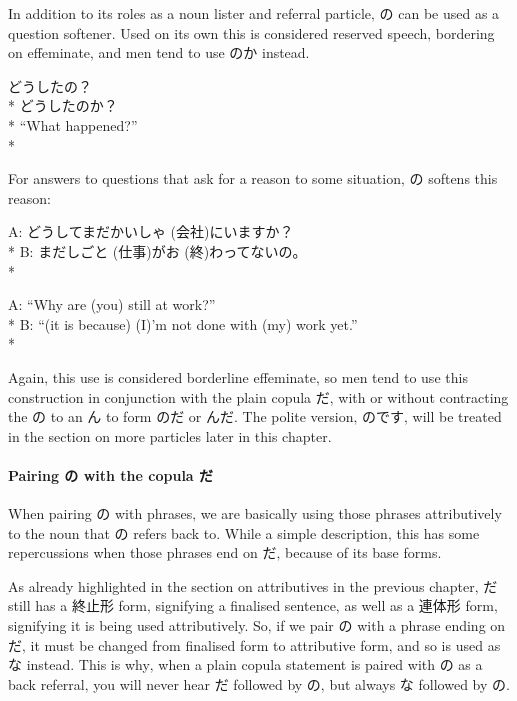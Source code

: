 \documentclass[11pt, b5paper, twoside, openright, onecolumn]{book}
\makeatletter
\newcommand*{\rubystack}[2]{{\relscale{0.5}%
  \begin{tabular}[b]{@{}c@{}}%
    {#1}\\%
   {\textscale{2}{#2}}%
  \end{tabular}}%
}
\DeclareRobustCommand*{\ruby}[2]{%
  \mbox{%
    \setlength{\parskip}{0ex}%
    \BeginAccSupp{method=pdfstringdef,ActualText={#1}}%
      \rubystack{\phantom{#2}}{#1}%
      \llap{%
        \rubystack{#2}{\phantom{#1}}%
      }%
    \EndAccSupp{}%
  }%
}
\renewcommand*{\ruby}[2]{#2 (#1)}%
\newenvironment{exampleblock}{
\setlength{\parindent}{0.6in}
\begin{minipage}[t]{\dimexpr\textwidth-\parindent}}
{\end{minipage}}
\makeatother
\begin{document}
In addition to its roles as a noun lister and referral particle‚ の can be used as a question softener. Used on its own this is considered reserved speech‚ bordering on effeminate‚ and men tend to use のか instead.

\vspace{0.4cm}
\begin{exampleblock}
どうしたの？ \\* 
どうしたのか？ \\* 
“What happened?” \\* 
\end{exampleblock}
\vspace{0.2cm}

For answers to questions that ask for a reason to some situation‚ の softens this reason:

\vspace{0.4cm}
\begin{exampleblock}
A: どうしてまだ\ruby{会社}{かいしゃ}にいますか？ \\* 
B: まだ\ruby{仕事}{しごと}が\ruby{終}{お}わってないの。 \\* 
\end{exampleblock}
\vspace{0.2cm}

\begin{exampleblock}
A: “Why are (you) still at work?” \\* 
B: “(it is because) (I)’m not done with (my) work yet.” \\* 
\end{exampleblock}
\vspace{0.2cm}

Again‚ this use is considered borderline effeminate‚ so men tend to use this construction in conjunction with the plain copula だ‚ with or without contracting the の to an ん to form のだ or んだ. The polite version‚ のです‚ will be treated in the section on more particles later in this chapter.

\paragraph{Pairing の with the copula だ}

When pairing の with phrases‚ we are basically using those phrases attributively to the noun that の refers back to. While a simple description‚ this has some repercussions when those phrases end on だ‚ because of its base forms. 

As already highlighted in the section on attributives in the previous chapter‚ だ still has a 終止形 form‚ signifying a finalised sentence‚ as well as a 連体形 form‚ signifying it is being used attributively. So‚ if we pair の with a phrase ending on だ‚ it must be changed from finalised form to attributive form‚ and so is used as な instead. This is why‚ when a plain copula statement is paired with の as a back referral‚ you will never hear だ followed by の‚ but always な followed by の.
\end{document}
